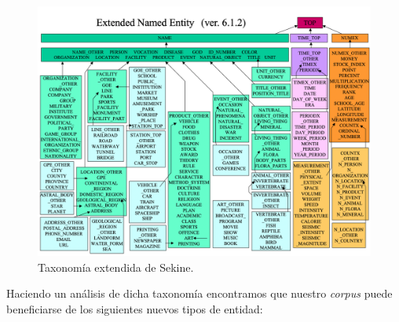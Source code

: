 \documentclass[12pt,a4paper,]{scrartcl}
\begin{document}
\begin{figure}[H]

{\centering \includegraphics{assets/sekine.pdf} 

}

\caption{Taxonomía extendida de Sekine.}\label{fig:fig-sekine}
\end{figure}

Haciendo un análisis de dicha taxonomía encontramos que nuestro \emph{corpus} puede beneficiarse de los siguientes nuevos tipos de entidad:
\end{document}
